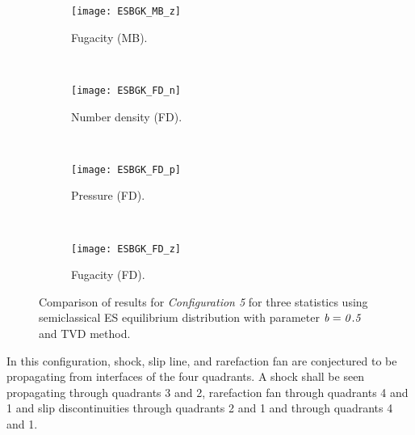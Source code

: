 \documentclass{rsproca}%
\begin{document}
\begin{figure}
\begin{subfigure}[b]{0.32\textwidth}
                \centering
                \texttt{[image: ESBGK\_MB\_z]}
                \caption{Fugacity (MB).}
                \label{fig:5ESBGK_MB_z}
        \end{subfigure}
        ~ %
        \begin{subfigure}[b]{0.32\textwidth}
                \centering
                \texttt{[image: ESBGK\_FD\_n]}
                \caption{Number density (FD).}
                \label{fig:5ESBGK_FD_n}
        \end{subfigure}
        ~ %
        \begin{subfigure}[b]{0.32\textwidth}
                \centering
                \texttt{[image: ESBGK\_FD\_p]}
                \caption{Pressure (FD).}
                \label{fig:5ESBGK_FD_p}
        \end{subfigure}
				~ %
        \begin{subfigure}[b]{0.32\textwidth}
                \centering
                \texttt{[image: ESBGK\_FD\_z]}
                \caption{Fugacity (FD).}
                \label{fig:5ESBGK_FD_z}
        \end{subfigure}
				\caption{Comparison of results for \emph{Configuration 5} for three statistics using semiclassical ES equilibrium distribution with parameter $\it{b=0.5}$ and TVD method.}
				\label{fig:test_configuration5}
\end{figure}

In this configuration, shock, slip line, and rarefaction fan are conjectured to be propagating from interfaces of the four quadrants. A shock shall be seen propagating through quadrants 3 and 2, rarefaction fan through quadrants 4 and 1 and slip discontinuities through quadrants 2 and 1 and through quadrants 4 and 1. \\
\end{document}
